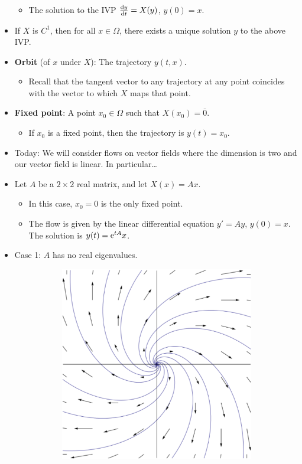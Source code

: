 \documentclass[../notes.tex]{subfiles}
\begin{document}
\begin{itemize}
\begin{itemize}
        \item The solution to the IVP $\dv{y}{t}=X(y)$, $y(0)=x$.
    \end{itemize}
    \item If $X$ is $C^1$, then for all $x\in\Omega$, there exists a unique solution $y$ to the above IVP.
    \item \textbf{Orbit} (of $x$ under $X$): The trajectory $y(t,x)$.
    \begin{itemize}
        \item Recall that the tangent vector to any trajectory at any point coincides with the vector to which $X$ maps that point.
    \end{itemize}
    \item \textbf{Fixed point}: A point $x_0\in\Omega$ such that $X(x_0)=\bar{0}$.
    \begin{itemize}
        \item If $x_0$ is a fixed point, then the trajectory is $y(t)=x_0$.
    \end{itemize}
    \item Today: We will consider flows on vector fields where the dimension is two and our vector field is linear. In particular\dots
    \item Let $A$ be a $2\times 2$ real matrix, and let $X(x)=Ax$.
    \begin{itemize}
        \item In this case, $x_0=0$ is the only fixed point.
        \item The flow is given by the linear differential equation $y'=Ay$, $y(0)=x$. The solution is $y(t)=\e[tA]x$.
    \end{itemize}
    \item Case 1: $A$ has no real eigenvalues.
    \begin{figure}[h!]
        \centering
        \begin{subfigure}[b]{0.32\linewidth}
            \centering
            \includegraphics[width=0.8\linewidth]{../ExtFiles/planarComplexa.png}

\end{subfigure}
\end{figure}
\end{itemize}
\end{document}
